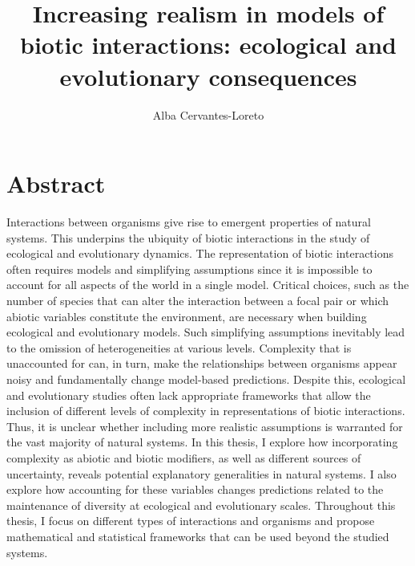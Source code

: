 \documentclass[12pt]{article}
\title{Increasing realism in models of biotic interactions: ecological and evolutionary consequences}
\author[1]{Alba Cervantes-Loreto}
\date{}
\begin{document}
\linenumbers
\baselineskip30pt
\maketitle

\section*{Abstract}
Interactions between organisms give rise to emergent properties of natural systems. This underpins the ubiquity of biotic interactions in the study of ecological and evolutionary dynamics. The representation of biotic interactions often requires models and simplifying assumptions since it is impossible to account for all aspects of the world in a single model. Critical choices, such as the number of species that can alter the interaction between a focal pair or which abiotic variables constitute the environment, are necessary when building ecological and evolutionary models. Such simplifying assumptions inevitably lead to the omission of heterogeneities at various levels. Complexity that is unaccounted for can, in turn, make the relationships between organisms appear noisy and fundamentally change model-based predictions. Despite this, ecological and evolutionary studies often lack appropriate frameworks that allow the inclusion of different levels of complexity in representations of biotic interactions. Thus, it is unclear whether including more realistic assumptions is warranted for the vast majority of natural systems. In this thesis, I explore how incorporating complexity as abiotic and biotic modifiers, as well as different sources of uncertainty, reveals potential explanatory generalities in natural systems. I also explore how accounting for these variables changes predictions related to the maintenance of diversity at ecological and evolutionary scales. Throughout this thesis, I focus on different types of interactions and organisms and propose mathematical and statistical frameworks that can be used beyond the studied systems.
\end{document}
